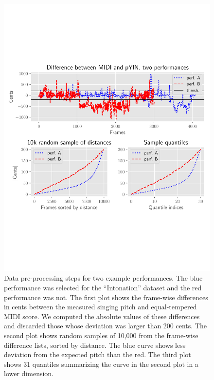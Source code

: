 \begin{figure}[h!]
    \centering
    \includegraphics[width=\textwidth]{figures/data_processing_pipeline.pdf}\vspace{-1in}
    \caption{Data pre-processing steps for two example performances. The blue performance was selected for the ``Intonation'' dataset and the red performance was not. The first plot shows the frame-wise differences in cents between the measured singing pitch and equal-tempered MIDI score. We computed the absolute values of these differences and discarded those whose deviation was larger than 200 cents. The second plot shows random samples of 10,000 from the frame-wise difference lists, sorted by distance. The blue curve shows less deviation from the expected pitch than the red. The third plot shows 31 quantiles summarizing the curve in the second plot in a lower dimension.}
    \label{fig:pipeline}
\end{figure}
